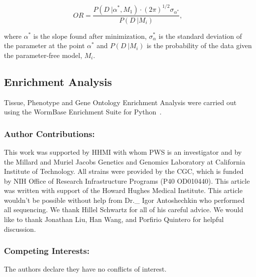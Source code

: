\documentclass[10pt, onecolumn]{article}
\begin{document}
\begin{equation}
  OR = \frac{
  P(D~|\alpha^*, M_1)\cdot (2\pi)^{1/2}\sigma_{\alpha^*} %
  }{P(D~| M_i)}, %
\end{equation}

where $\alpha^*$ is the slope found after minimization, $\sigma_\alpha^*$ is the
standard deviation of the parameter at the point $\alpha^*$ and $P(D~|M_i)$ is the
probability of the data given the parameter-free model, $M_i$.

\subsection*{Enrichment Analysis}
Tissue, Phenotype and Gene Ontology Enrichment Analysis were carried out using
the WormBase Enrichment Suite for Python~\cite{Angeles-Albores2016b,
Angeles-Albores2016}.



\subsubsection*{Author Contributions:}
This work was supported by HHMI with whom PWS is an investigator
and by the Millard and Muriel Jacobs Genetics and Genomics Laboratory at
California Institute of Technology.
All strains were provided by the CGC, which is funded by NIH Office of Research
Infrastructure Programs (P40 OD010440).
This article was written with support of the Howard Hughes Medical Institute.
This article wouldn't be possible without help from Dr.\_ Igor Antoshechkin who
performed all sequencing.
We thank Hillel Schwartz for all of his careful advice.
We would like to thank Jonathan Liu, Han Wang, and Porfirio Quintero for helpful
discussion.

\subsubsection*{Competing Interests:}
The authors declare they have no conflicts of interest.


\nolinenumbers{}




\end{document}
